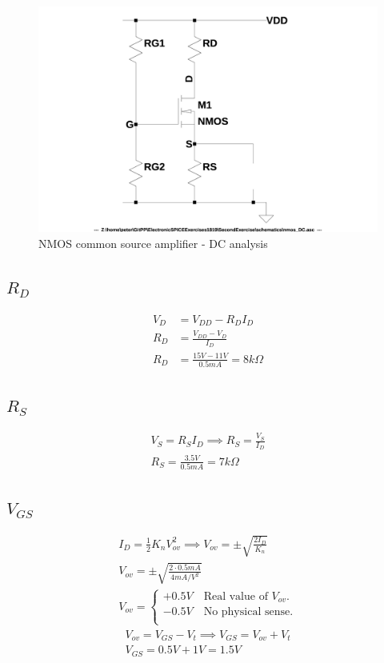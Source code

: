 \documentclass[10pt,a4paper]{book}
\begin{document}
\begin{figure}[h]
  \centering
  \includegraphics[width=12cm]{schematics/nmos_DC.jpg}
  \caption{NMOS common source amplifier - DC analysis}
  \label{nmos_DC}
\end{figure}

\subsection{$R_D$}
\begin{align}
V_{D} &= V_{DD} - R_D I_D\\
R_D &= \frac{V_{DD} - V_D}{I_D}\\
R_D &= \frac{15V - 11V}{0.5mA} = 8k\Omega
\end{align}

\subsection{$R_S$}
\begin{align}
V_S = R_S I_D \implies 
R_S = \frac{V_S}{I_D}\\
R_S = \frac{3.5V}{0.5mA} = 7k\Omega
\end{align}

\subsection{$V_{GS}$}
\begin{align}
I_D = \frac{1}{2}K_nV_{ov}^2 \implies
V_{ov} = \pm \sqrt{\frac{2 I_D}{K_n}}\\
V_{ov} = \pm \sqrt{\frac{2 \cdot 0.5mA}{4 mA/V^2}}\\
V_{ov} =
\left\{\begin{array}{l}
  + 0.5V \quad \text{Real value of } V_{ov} \text{.}\\
  - 0.5V \quad \text{No physical sense.}\\
\end{array}\right.
\end{align}
\begin{align}
V_{ov} = V_{GS} - V_{t} \implies
V_{GS} = V_{ov} + V_{t}\\
V_{GS} = 0.5V + 1V = 1.5V
\end{align}
\end{document}
